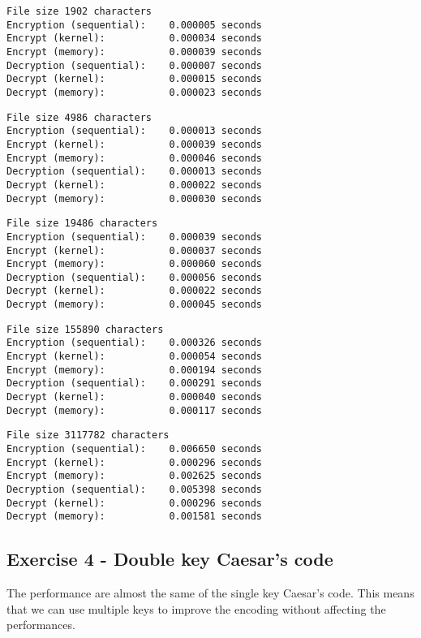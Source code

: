 \documentclass[a4paper]{article}
\begin{document}
\begin{verbatim}
File size 1902 characters
Encryption (sequential):    0.000005 seconds
Encrypt (kernel):           0.000034 seconds
Encrypt (memory):           0.000039 seconds
Decryption (sequential):    0.000007 seconds
Decrypt (kernel):           0.000015 seconds
Decrypt (memory):           0.000023 seconds
\end{verbatim}
\begin{verbatim}
File size 4986 characters
Encryption (sequential):    0.000013 seconds
Encrypt (kernel):           0.000039 seconds
Encrypt (memory):           0.000046 seconds
Decryption (sequential):    0.000013 seconds
Decrypt (kernel):           0.000022 seconds
Decrypt (memory):           0.000030 seconds
\end{verbatim}
\begin{verbatim}
File size 19486 characters
Encryption (sequential):    0.000039 seconds
Encrypt (kernel):           0.000037 seconds
Encrypt (memory):           0.000060 seconds
Decryption (sequential):    0.000056 seconds
Decrypt (kernel):           0.000022 seconds
Decrypt (memory):           0.000045 seconds
\end{verbatim}
\begin{verbatim}
File size 155890 characters
Encryption (sequential):    0.000326 seconds
Encrypt (kernel):           0.000054 seconds
Encrypt (memory):           0.000194 seconds
Decryption (sequential):    0.000291 seconds
Decrypt (kernel):           0.000040 seconds
Decrypt (memory):           0.000117 seconds
\end{verbatim}
\begin{verbatim}
File size 3117782 characters
Encryption (sequential):    0.006650 seconds
Encrypt (kernel):           0.000296 seconds
Encrypt (memory):           0.002625 seconds
Decryption (sequential):    0.005398 seconds
Decrypt (kernel):           0.000296 seconds
Decrypt (memory):           0.001581 seconds
\end{verbatim}

\subsection{Exercise 4 - Double key Caesar's code}

The performance are almost the same of the single key Caesar's code. This means that we can use multiple keys to improve the encoding without affecting the performances.
\end{document}
